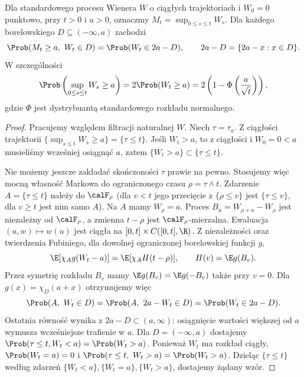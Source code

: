 \begin{twierdzenie}
\label{thm:wiener-reflection}
Dla standardowego procesu Wienera $W$ o ciągłych
trajektoriach i $W_0=0$ punktowo, przy $t>0$ i $a>0$,
oznaczmy $M_t=\sup_{0\le s\le t}W_s$.
Dla każdego borelowskiego $D\subseteq(-\infty,a)$
zachodzi
\[
\Prob(M_t\ge a,\ W_t\in D)=\Prob(W_t\in 2a-D),
\qquad 2a-D=\{2a-x:x\in D\}.
\]
W szczególności
\[
\Prob\left(\sup_{0\le s\le t}W_s\ge a\right)
=2\Prob(W_t\ge a)
=2\left(1-\Phi\left(\frac{a}{\sqrt t}\right)\right),
\]
gdzie $\Phi$ jest dystrybuantą standardowego rozkładu normalnego.
\end{twierdzenie}
\begin{proof}
Pracujemy względem filtracji naturalnej $W$.
Niech $\tau=\tau_a$. Z ciągłości trajektorii
$\{\sup_{s\le t}W_s\ge a\}=\{\tau\le t\}$.
Jeśli $W_t>a$, to z ciągłości i $W_0=0<a$ musieliśmy
wcześniej osiągnąć $a$, zatem $\{W_t>a\}\subset\{\tau\le t\}$.

Nie możemy jeszcze zakładać skończoności $\tau$
prawie na pewno. Stosujemy więc mocną własność Markowa
do ograniczonego czasu $\rho=\tau\wedge t$.
Zdarzenie $A=\{\tau\le t\}$ należy do $\calF_\rho$
(dla $v<t$ jego przecięcie z $\{\rho\le v\}$ jest
$\{\tau\le v\}$, dla $v\ge t$ jest nim samo $A$).
Na $A$ mamy $W_\rho=a$.
Proces $B_u=W_{\rho+u}-W_\rho$ jest niezależny
od $\calF_\rho$, a zmienna $t-\rho$ jest
$\calF_\rho$-mierzalna. Ewaluacja $(u,w)\mapsto w(u)$
jest ciągła na $[0,t]\times C([0,t],\R)$.
Z niezależności oraz twierdzenia Fubiniego, dla
dowolnej ograniczonej borelowskiej funkcji $g$,
\[
\E[\chi_A g(W_t-a)]
=\E[\chi_A H(t-\rho)],\qquad H(v)=\E g(B_v).
\]
Przez symetrię rozkładu $B_v$ mamy
$\E g(B_v)=\E g(-B_v)$ także przy $v=0$.
Dla $g(x)=\chi_D(a+x)$ otrzymujemy więc
\[
\Prob(A,\ W_t\in D)
=\Prob(A,\ 2a-W_t\in D)
=\Prob(W_t\in 2a-D).
\]
Ostatnia równość wynika z $2a-D\subset(a,\infty)$:
osiągnięcie wartości większej od $a$ wymusza
wcześniejsze trafienie w $a$.
Dla $D=(-\infty,a)$ dostajemy
$\Prob(\tau\le t,W_t<a)=\Prob(W_t>a)$.
Ponieważ $W_t$ ma rozkład ciągły,
$\Prob(W_t=a)=0$ i
$\Prob(\tau\le t,\ W_t>a)=\Prob(W_t>a)$.
Dzieląc $\{\tau\le t\}$ według zdarzeń
$\{W_t<a\},\{W_t=a\},\{W_t>a\}$,
dostajemy żądany wzór.
\end{proof}

